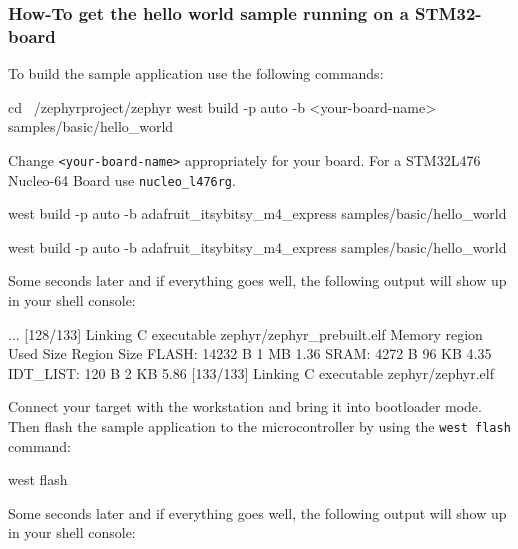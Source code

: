 
\subsubsection{How-To get the hello world sample running on a STM32-board}
To build the sample application use the following commands:

\begin{bashbox}
cd ~/zephyrproject/zephyr
west build -p auto -b <your-board-name> samples/basic/hello_world
\end{bashbox}

Change \texttt{<your-board-name>} appropriately for your board. For a STM32L476 Nucleo-64 Board use \texttt{nucleo_l476rg}.


\begin{bashbox}
west build -p auto -b adafruit_itsybitsy_m4_express samples/basic/hello_world
\end{bashbox}

\begin{bashbox}
west build -p auto -b adafruit_itsybitsy_m4_express samples/basic/hello_world
\end{bashbox}


Some seconds later and if everything goes well, the following output will show up in your shell console:

\begin{textbox}
...
[128/133] Linking C executable zephyr/zephyr_prebuilt.elf
Memory region         Used Size  Region Size  %
           FLASH:       14232 B         1 MB      1.36%
            SRAM:        4272 B        96 KB      4.35%
        IDT_LIST:         120 B         2 KB      5.86%
[133/133] Linking C executable zephyr/zephyr.elf
\end{textbox}


Connect your target with the workstation and bring it into bootloader mode. Then flash the sample application to the microcontroller by using the \texttt{west flash} command:

\begin{bashbox}
west flash
\end{bashbox}

Some seconds later and if everything goes well, the following output will show up in your shell console:

